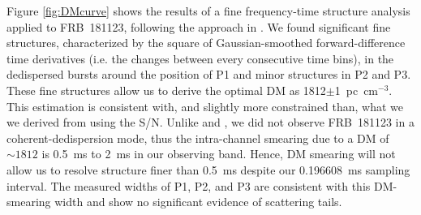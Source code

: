 Figure \ref{fig:DMcurve} shows the results of a fine frequency-time structure analysis applied to FRB~181123, following the approach in \citet{hessels19}. We found significant fine structures, characterized by the square of Gaussian-smoothed forward-difference time derivatives (i.e. the changes between every consecutive time bins), in the dedispersed bursts around the position of P1 and minor structures in P2 and P3. These fine structures allow us to derive the optimal DM as 1812$\pm$1~pc~cm$^{-3}$. This estimation is consistent with, and slightly more constrained than, what we we derived from using the S/N.
Unlike \citet{gsp+18} and \citet{hessels19}, we did not observe FRB~181123 in a coherent-dedispersion mode, thus the intra-channel smearing due to a DM of $\sim1812$ is 0.5~ms to 2~ms in our observing band. Hence,
DM smearing will not allow us to resolve structure finer than 0.5~ms despite our 0.196608~ms sampling interval.
The measured widths of P1, P2, and P3 are consistent with this DM-smearing width and show no significant evidence of scattering tails. 



